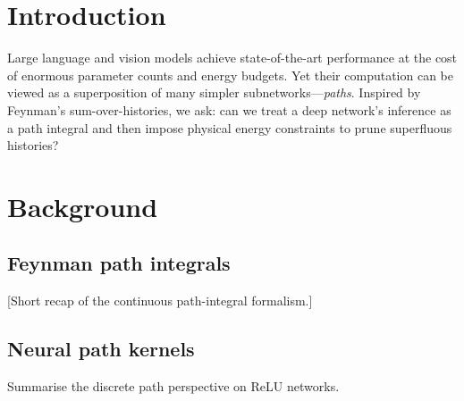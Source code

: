 \documentclass[11pt]{article}
\title{Neural Path Integrals and the Semantic Action Principle\[2ex]\
  \large A Physics-Inspired Framework for Energy-Bound Pruning in Deep Networks}
\author{Paolo Pignatelli\\Independent Researcher\\\texttt{paolo@verbumtechnologies.com}}
\date{July 29, 2025}
\begin{document}
\maketitle

\begin{abstract}
We show that the forward inference pass of a gated feed-forward neural network can be written as a discrete Feynman path integral whose action is the (negative) log-product of synaptic weights along an active path.  Promoting this \emph{semantic action} to a physical Hamiltonian density allows us to import energy-based bounds—analogous to the Bekenstein–Bremermann limit—into learning theory.  We derive an \emph{Energy-Constrained Cardinality Cascade} that upper-bounds the number of admissible paths and yields a principled pruning criterion.  A toy ReLU network experiment confirms that the cascade retains predictive accuracy while eliminating \(90\,\%\) of zero-contributing paths.  The framework unifies recent neural-path-kernel results with information-theoretic limits and lays groundwork for hardware designs that implement complex weight phases.\end{abstract}

\tableofcontents

\section{Introduction}
Large language and vision models achieve state-of-the-art performance at the cost of enormous parameter counts and energy budgets.  Yet their computation can be viewed as a superposition of many simpler subnetworks—\emph{paths}.  Inspired by Feynman's sum-over-histories, we ask: can we treat a deep network's inference as a path integral and then impose physical energy constraints to prune superfluous histories?

\section{Background}
\subsection{Feynman path integrals}
[Short recap of the continuous path-integral formalism.]

\subsection{Neural path kernels}
Summarise\cite{chatterjee2020neural,pham2022path} the discrete path perspective on ReLU networks.
\end{document}
